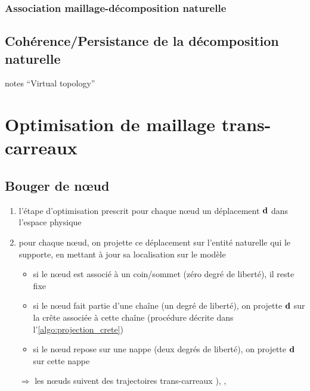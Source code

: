 \subsubsection{Association maillage-décomposition naturelle}



\subsection{Cohérence/Persistance de la décomposition naturelle}
\cf notes ``Virtual topology''









\section{Optimisation de maillage trans-carreaux}

\subsection{Bouger de n\oe ud}
\label{section:projection_surface_composite}
\begin{enumerate}
	\item l'étape d'optimisation prescrit pour chaque n\oe ud un déplacement $\mathbf{d}$ dans l'espace physique
	\item pour chaque n\oe ud, on projette ce déplacement sur l'entité naturelle qui le supporte, en mettant à jour sa localisation sur le modèle \brep
	\begin{itemize}
		\item si le n\oe ud est associé à un coin/sommet (zéro degré de liberté), il reste fixe 
		\item si le n\oe ud fait partie d'une chaîne (un degré de liberté), on projette $\mathbf{d}$ sur la crête associée à cette chaîne (procédure décrite dans l'\autoref{algo:projection_crete})
		\item si le n\oe ud repose sur une nappe (deux degrés de liberté), on projette $\mathbf{d}$ sur cette nappe
	\end{itemize}
	\item[$\Rightarrow$] les n\oe uds suivent des trajectoires trans-carreaux \cite[Section~5.5]{foucault2008}), \cite{thompson2005}, \cite[p.42 et Section~4.4.1]{crozet2017}
\end{enumerate}

